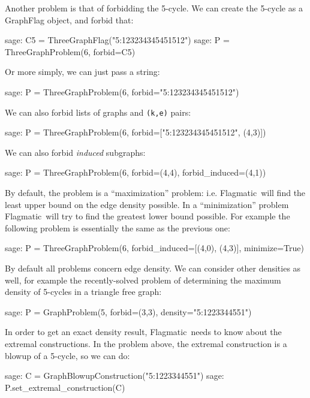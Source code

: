 \documentclass{article}
\providecommand{\flagmatic}{Flagmatic}
\begin{document}
Another problem is that of forbidding the 5-cycle. We can create the 5-cycle as a GraphFlag object, and forbid that:

\begin{sage}
sage: C5 = ThreeGraphFlag("5:123234345451512")
sage: P = ThreeGraphProblem(6, forbid=C5)
\end{sage}

Or more simply, we can just pass a string:

\begin{sage}
sage: P = ThreeGraphProblem(6, forbid="5:123234345451512")
\end{sage}

We can also forbid lists of graphs and \verb|(k,e)| pairs:

\begin{sage}
sage: P = ThreeGraphProblem(6, forbid=["5:123234345451512", (4,3)])
\end{sage}

We can also forbid \emph{induced} subgraphs:

\begin{sage}
sage: P = ThreeGraphProblem(6, forbid=(4,4), forbid_induced=(4,1))
\end{sage}

By default, the problem is a ``maximization'' problem: i.e{.} \flagmatic\ will find the least upper bound on the edge density possible. In a ``minimization'' problem \flagmatic\ will try to find the greatest lower bound possible. For example the following problem is essentially the same as the previous one:

\begin{sage}
sage: P = ThreeGraphProblem(6, forbid_induced=[(4,0), (4,3)], minimize=True)
\end{sage}

By default all problems concern edge density. We can consider other densities as well, for example the recently-solved problem of determining the maximum density of 5-cycles in a triangle free graph:

\begin{sage}
sage: P = GraphProblem(5, forbid=(3,3), density="5:1223344551")
\end{sage}

In order to get an exact density result, \flagmatic\ needs to know about the extremal constructions. In the problem above, the extremal construction is a blowup of a 5-cycle, so we can do:

\begin{sage}
sage: C = GraphBlowupConstruction("5:1223344551")
sage: P.set_extremal_construction(C)
\end{sage}
\end{document}
